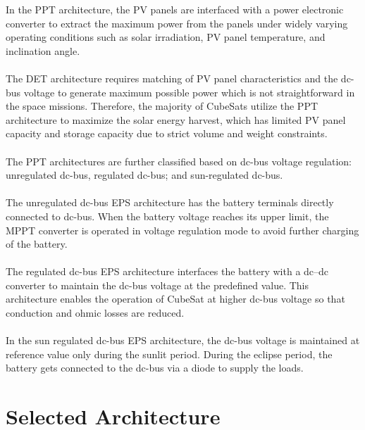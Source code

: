  In the PPT architecture, the PV panels are interfaced with a power electronic converter to extract the maximum power from the panels under widely varying operating conditions such as solar irradiation, PV panel temperature, and inclination angle. 
 \\ \\
The DET architecture requires matching of PV panel characteristics and the dc-bus voltage to generate maximum possible power which is not straightforward in the space missions. Therefore, the majority of CubeSats utilize the PPT architecture to maximize the solar energy harvest, which has limited PV panel capacity and storage capacity due to strict volume and weight constraints. 
\\ \\
The PPT architectures are further classified based on dc-bus voltage regulation: unregulated dc-bus, regulated dc-bus; and sun-regulated dc-bus. 
\\ \\
The unregulated dc-bus EPS architecture has the battery terminals directly connected to dc-bus. When the battery voltage reaches its upper limit, the MPPT converter is operated in voltage regulation mode to avoid further charging of the battery. 
\\ \\
The regulated dc-bus EPS architecture interfaces the battery with a dc–dc converter to maintain the dc-bus voltage at the predefined value. This architecture enables the operation of CubeSat at higher dc-bus voltage so that conduction and ohmic losses are reduced. 
\\ \\
In the sun regulated dc-bus EPS architecture, the dc-bus voltage is maintained at reference value only during the sunlit period. During the eclipse period, the battery gets connected to the dc-bus via a diode to supply the loads.


\section[Selected Architecture]{Selected Architecture}

